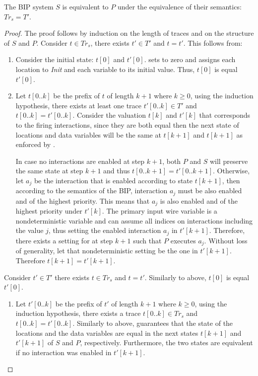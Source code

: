 \begin{theorem}
\label{theorem:correct}
The BIP system $S$ is equivalent to $P$ under the equivalence of their semantics: $Tr_s=T'$.  
\end{theorem}
\begin{proof}
The proof follows by induction on the length of traces and on the structure of $S$ and $P$.
%
Consider $t \in Tr_s$, there exists $t' \in T'$ and $t = t'$. This follows from: 
\begin{enumerate}
\item Consider the initial state: $t[0]$ and $t'[0]$.  sets  to zero and assigns each location to \textit{Init} and each variable to its initial value. Thus, $t[0]$ is equal $t'[0]$. 
\item Let $t[0..k]$ be the prefix of $t$ of length $k+1$ where $k\ge 0$, using the induction hypothesis, there exists at least one trace 
  $t'[0..k] \in T'$ and $t[0..k]=t'[0..k]$. 
  Consider the valuation $t[k]$ and $t'[k]$ that corresponds to the firing interactions, since they are both equal then the next state of locations
  and data variables will be the same at $t[k+1]$ and $t[k+1]$ as enforced by . 

  In case no interactions are enabled at step $k+1$, both $P$ and $S$ will preserve the same state at step $k+1$ and thus $t[0..k+1] =t'[0..k+1]$. 
  Otherwise, let $a_j$ be the interaction that is enabled according to state $t[k+1]$, 
  then according to the semantics of the BIP, interaction $a_j$ must be also enabled and of the highest priority. 
  This means that $a_j$ is also enabled and of the highest priority under $t'[k]$. 
  The primary input  wire variable is a nondeterministic variable and can assume all indices on interactions including the value 
  $j$, thus setting the enabled interaction $a_j$ in $t'[k+1]$. 
  Therefore, there exists a setting for  at step $k+1$ such that $P$ executes $a_j$. 
  Without loss of generality, let that nondeterministic setting be the one in $t'[k+1]$. 
  Therefore $t[k+1] = t'[k+1]$. 
\end{enumerate}
Consider $t' \in T'$ there exists $t \in Tr_s$ and $t = t'$. Similarly to above, $t[0]$ is equal $t'[0]$.
\begin{enumerate}
\item Let $t'[0..k]$ be the prefix of $t'$ of length $k+1$ where $k\ge 0$, using the induction hypothesis, there exists a trace 
  $t[0..k] \in Tr_s$ and $t[0..k]=t'[0..k]$. 
  Similarly to above,  guarantees that the state of the locations and the data variables are equal in the next states $t[k+1]$ and $t'[k+1]$ of $S$ and $P$, respectively. Furthermore, the two states are equivalent if no interaction was enabled in $t'[k+1]$. 


\end{enumerate}
\end{proof}
